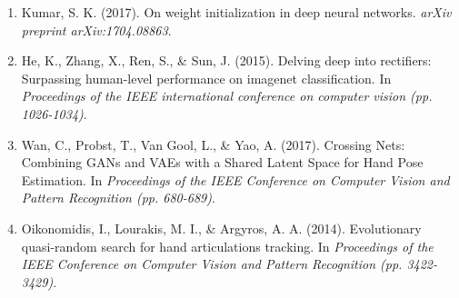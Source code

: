 \documentclass{article}
\begin{document}
\begin{enumerate}
\item Kumar, S. K. (2017). On weight initialization in deep neural networks. \emph{arXiv preprint arXiv:1704.08863}.
\item He, K., Zhang, X., Ren, S., \& Sun, J. (2015). Delving deep into rectifiers: Surpassing human-level performance on imagenet classification. In \emph{Proceedings of the IEEE international conference on computer vision (pp. 1026-1034)}.
\item Wan, C., Probst, T., Van Gool, L., \& Yao, A. (2017). Crossing Nets: Combining GANs and VAEs with a Shared Latent Space for Hand Pose Estimation. In \emph{Proceedings of the IEEE Conference on Computer Vision and Pattern Recognition (pp. 680-689)}.
\item Oikonomidis, I., Lourakis, M. I., \& Argyros, A. A. (2014). Evolutionary quasi-random search for hand articulations tracking. In \emph{Proceedings of the IEEE Conference on Computer Vision and Pattern Recognition (pp. 3422-3429)}.
\end{enumerate}
\end{document}
